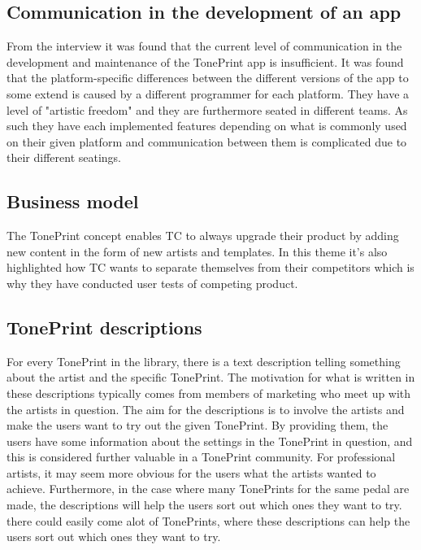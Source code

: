 \subsection*{Communication in the development of an app}
\label{App:ThemeCommunicationInTheDevelopmentOfAnApp}
From the interview it was found that the current level of communication in the development and maintenance of the TonePrint app is insufficient. It was found that the platform-specific differences between the different versions of the app to some extend is caused by a different programmer for each platform. They have a level of "artistic freedom" and they are furthermore seated in different teams. As such they have each implemented features depending on what is commonly used on their given platform and communication between them is complicated due to their different seatings.

\subsection*{Business model}
\label{App:ThemeBusinessModel}
The TonePrint concept enables TC to always upgrade their product by adding new content in the form of new artists and templates. In this theme it's also highlighted how TC wants to separate themselves from their competitors which is why they have conducted user tests of competing product.

\subsection*{TonePrint descriptions} 
\label{App:ThemeTonePrintDescription}
For every TonePrint in the library, there is a text description telling something about the artist and the specific TonePrint. The motivation for what is written in these descriptions typically comes from members of marketing who meet up with the artists in question. The aim for the descriptions is to involve the artists and make the users want to try out the given TonePrint. By providing them, the users have some information about the settings in the TonePrint in question, and this is considered further valuable in a TonePrint community. For professional artists, it may seem more obvious for the users what the artists wanted to achieve. Furthermore, in the case where many TonePrints for the same pedal are made, the descriptions will help the users sort out which ones they want to try. there could easily come alot of TonePrints, where these descriptions can help the users sort out which ones they want to try. 


